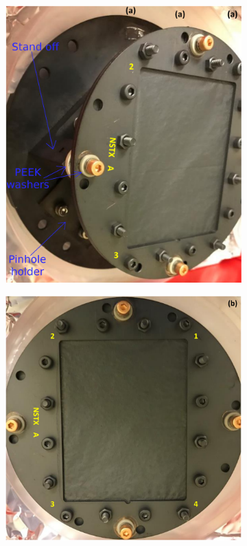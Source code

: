 \begin{figure}
     \centering
     \begin{subfigure}{0.35\linewidth}
         \centering
         \includegraphics[trim={0 0 600 0},clip,width=\textwidth]{Chapters/chapter2/figs/foil_markings3.png}
         \label{fig:foil markings1}
     \end{subfigure}
     \begin{subfigure}{0.63
     \linewidth}
         \centering
         \includegraphics[trim={50 0 0 0},clip,width=\textwidth]{Chapters/chapter2/figs/foil_markings.png}

\end{subfigure}
\end{figure}
